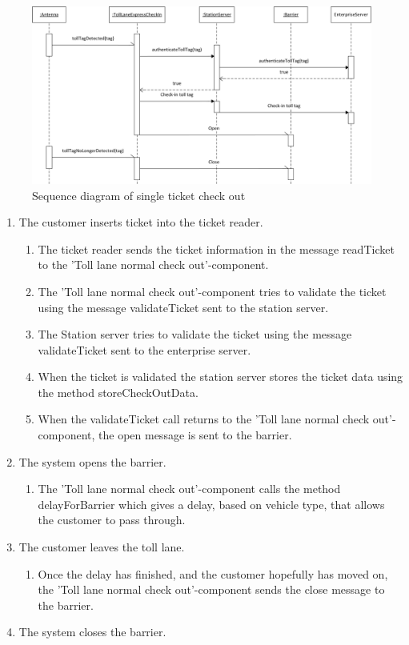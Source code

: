 \documentclass[11pt]{article}
\begin{document}
\begin{figure}[h]
\centering
\includegraphics[width=0.7\linewidth]{../report/img/sequence_diagrams/sequence_diagram_toll_tag_check_in.png}
\caption[fig1]{Sequence diagram of single ticket check out}
\label{fig1}
\end{figure}

\begin{enumerate}
\item The customer inserts ticket into the ticket reader.
\begin{enumerate}
\item The ticket reader sends the ticket information in the message readTicket to the 'Toll lane normal check out'-component.
\item The 'Toll lane normal check out'-component tries to validate the ticket using the message validateTicket sent to the station server.
\item The Station server tries to validate the ticket using the message validateTicket sent to the enterprise server.
\item When the ticket is validated the station server stores the ticket data using the method storeCheckOutData.
\item When the validateTicket call returns to the 'Toll lane normal check out'-component, the open message is sent to the barrier.
\end{enumerate}
\item The system opens the  barrier.
\begin{enumerate}
\item The 'Toll lane normal check out'-component calls the method delayForBarrier which gives a delay, based on vehicle type, that allows the customer to pass through.
\end{enumerate}
\item The customer leaves the toll lane.
\begin{enumerate}
\item Once the delay has finished, and the customer hopefully has moved on, the 'Toll lane normal check out'-component sends the close message to the barrier.
\end{enumerate}
\item The system closes the barrier.

\end{enumerate}
\end{document}
